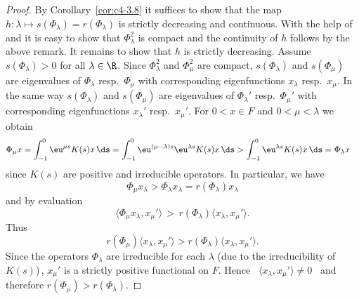 \begin{proof}
By Corollary~\ref{cor:c4-3.8} it suffices to show that the map $h \colon \lambda \mapsto s(\Phi_{\lambda}) = r(\Phi_{\lambda})$ is strictly decreasing and continuous.
With the help of \textcite[Theorem III.11.4]{schaefer:1966} and \textcite[Theorem II.9.9]{schaefer:1974} it is easy to show that $\Phi_{\lambda}^{2}$ is compact and the continuity of\/ $h$ follows by the above remark.
It remains to show that $h$ is strictly decreasing.
Assume $s(\Phi_{\lambda}) > 0$ for all $\lambda \in \R$.
Since $\Phi_{\lambda}^{2}$ and $\Phi_{\mu}^{2}$ are compact, 
$s(\Phi_{\lambda})$ and $s(\Phi_{\mu})$ are eigenvalues of\/ $\Phi_{\lambda}$ resp.\ $\Phi_{\mu}$ with corresponding eigenfunctions $x_{\lambda}$ resp.\ $x_{\mu}$.
In the same way $s(\Phi_{\lambda})$ and $s(\Phi_{\mu})$ are eigenvalues of\/ $\Phi_{\lambda}'$ resp.\ $\Phi_{\mu}'$ with corresponding eigenfunctions $x_{\lambda}'$ resp.\ $x_{\mu}'$.
For $0 < x \in F$ and $0 < \mu < \lambda$ we obtain
\begin{align*}
\Phi_{\mu}x &= \int_{-1}^{0} \eu^{\mu s}K(s)x \, \ds = \int_{-1}^{0} \eu^{(\mu-\lambda) s}\eu^{\lambda s}K(s)x \, \ds > \int_{-1}^{0} \eu^{\lambda s}K(s)x \, \ds = \Phi_{\lambda}x
\end{align*}
since $K(s)$ are positive and irreducible operators.
In particular, we have 
%
\[
	\Phi_{\mu}x_{\lambda} > \Phi_{\lambda}x_{\lambda} = r(\Phi_{\lambda})x_{\lambda}
\]
%
and by evaluation %
\[
	\langle\Phi_{\mu}x_{\lambda},x_{\mu}'\rangle \,>\, r(\Phi_{\lambda})\langle x_{\lambda},x_{\mu}'\rangle .
\]
%
Thus %
\[
	r(\Phi_{\mu})\langle x_{\lambda},x_{\mu}'\rangle > r(\Phi_{\lambda})\langle x_{\lambda},x_{\mu}'\rangle .
\]
%
Since the operators $\Phi_{\lambda}$ are irreducible for each $\lambda$ (due to the irreducibility of\/ $K(s)$)\,, $x_{\mu}'$ is a strictly positive functional on $F$.
Hence \ $\langle x_{\lambda},x_{\mu}'\rangle \neq 0$ \ and therefore
$r(\Phi_{\mu}) > r(\Phi_{\lambda})$.
\end{proof}
